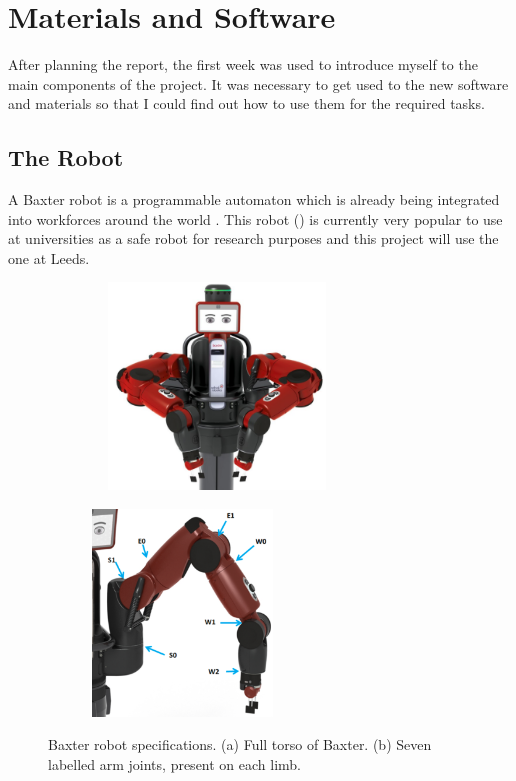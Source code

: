 \chapter{Materials and Software}
\label{chapter3}
After planning the report, the first week was used to introduce myself to the main components of the project. It was necessary to get used to the new software and materials so that I could find out how to use them for the required tasks.
\section{The Robot}
A Baxter robot is a programmable automaton which is already being integrated into workforces around the world \cite{baxterweb}. This robot (\textbf{}) is currently very popular to use at universities as a safe robot for research purposes and this project will use the one at Leeds.
\begin{figure}[H]
    \captionsetup[figure]{justification=centering}
    \begin{subfigure}[H]{0.475\textwidth}   
        \centering 
        \caption{}
        \includegraphics[width=0.75\textwidth, height=5.5cm]{baxtermain.png}
        \label{fig:baxtertorso}
    \end{subfigure}
    \begin{subfigure}[H]{0.475\textwidth}   
        \centering
        \caption{}
        \includegraphics[width=0.55\textwidth, height=5.5cm]{baxterjoints.png}
        \label{fig:baxterjoints}
    \end{subfigure}
    \captionsetup{justification=centering}
    \caption{Baxter robot specifications. (a) Full torso of Baxter. (b) Seven labelled arm joints, present on each limb.}
\end{figure}
